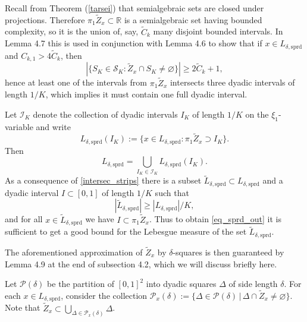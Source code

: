 \documentclass[12pt]{article}
\let\oldref\ref
\renewcommand{\ref}[1]{(\oldref{#1})}
\theoremstyle{definition}
\theoremstyle{remark}
\numberwithin{equation}{section}
\begin{document}
Recall from Theorem \ref{tarsei} that semialgebraic sets are closed under projections. Therefore $\pi_1 \widetilde{Z}_x\subset\mathbb{R}$ is a semialgebraic set having bounded complexity, so it is the union of, say, $\tilde{C}_k$ many disjoint bounded intervals. In Lemma 4.7 this is used in conjunction with Lemma 4.6 to show that if $x\in L_{\delta,\mathrm{sprd}}$ and $C_{k,1}>4\tilde{C}_k$, then 
\begin{equation}\label{intersec_strips}
    |\{S_K\in\mathcal{S}_K : \widetilde{Z}_x\cap S_K\neq\varnothing\}|\geq 2\tilde{C}_k +1,
\end{equation}
hence at least one of the intervals from $\pi_1 \widetilde{Z}_x$ intersects three dyadic intervals of length $1/K$, which implies it must contain one full dyadic interval.

Let $\mathcal{I}_K$ denote the collection of dyadic intervals $I_K$ of length $1/K$ on the $\xi_1$-variable and write
\begin{equation*}
L_{\delta,\mathrm{sprd}}(I_K):=\{x\in L_{\delta,\mathrm{sprd}} : \pi_1 \widetilde{Z}_x \supset I_K\}.
\end{equation*}
Then 
\begin{equation*}
    L_{\delta,\mathrm{sprd}} = \bigcup_{I_K\in\mathcal{I}_K}L_{\delta,\mathrm{sprd}}(I_K).
\end{equation*}
As a consequence of \eqref{intersec_strips} there is a subset $\widetilde{L}_{\delta,\mathrm{sprd}}\subset L_{\delta,\mathrm{sprd}}$ and a dyadic interval $I\subset [0,1]$ of length $1/K$ such that
\begin{equation}
|\widetilde{L}_{\delta,\mathrm{sprd}}|\geq |L_{\delta,\mathrm{sprd}}|/K,
\end{equation}
and for all $x\in \widetilde{L}_{\delta,\mathrm{sprd}}$ we have $I\subset \pi_1 \widetilde{Z}_x$. Thus to obtain \eqref{eq_sprd_out} it is sufficient to get a good bound for the Lebesgue measure of the set $\widetilde{L}_{\delta,\mathrm{sprd}}$.

The aforementioned approximation of $\widetilde{Z}_x$ by $\delta$-squares is then guaranteed by Lemma 4.9 at the end of subsection 4.2, which we will discuss briefly here.

Let $\mathcal{P}(\delta)$ be the partition of $[0,1]^2$ into dyadic squares $\Delta$ of side length $\delta$. For each $x\in L_{\delta,\mathrm{sprd}}$, consider the collection $\mathcal{P}_x (\delta):=\{\Delta\in\mathcal{P}(\delta) \,|\, \Delta\cap\tilde{Z}_x\neq\varnothing\}$. Note that $\widetilde{Z}_x \subset\bigcup_{\Delta\in\mathcal{P}_x(\delta)}\Delta$.
\end{document}
